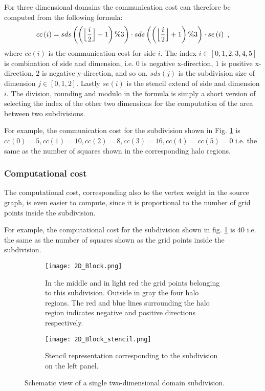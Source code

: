 For three dimensional domains the communication cost can therefore be computed from the following formula:
\begin{equation}
cc\left(i\right) = sds\left(\left(\floor[\Big]{\frac{i}{2}} - 1\right) \% 3 \right) \cdot sds\left(\left(\floor[\Big]{\frac{i}{2}} + 1\right) \% 3 \right) \cdot se\left(i\right) \text{ ,}
\end{equation}
where $cc\left(i\right)$ is the communication cost for side $i$.
The index $i \in \left[0, 1, 2, 3, 4, 5\right]$ is combination of side and dimension, i.e. $0$ is negative x-direction, $1$ is positive x-direction, $2$ is negative y-direction, and so on.
$sds\left(j\right)$ is the subdivision size of dimension $j \in \left[0,1,2\right]$.
Lastly $se\left(i\right)$ is the stencil extend of side and dimension $i$.
The division, rounding and modulo in the formula is simply a short version of selecting the index of the other two dimensions for the computation of the area between two subdivisions.

For example, the communication cost for the subdivision shown in Fig. \ref{fig:2DBlock} is $cc\left(0\right) = 5, cc\left(1\right) = 10, cc\left(2\right) = 8, cc\left(3\right) = 16, cc\left(4\right) = cc\left(5\right) = 0$ i.e. the same as the number of squares shown in the corresponding halo regions.

\subsubsection{Computational cost}
\label{sec:compcost}
The computational cost, corresponding also to the vertex weight in the source graph, is even easier to compute, since it is proportional to the number of grid points inside the subdivision.

For example, the computational cost for the subdivision shown in fig. \ref{fig:2DBlock} is $40$ i.e. the same as the number of squares shown as the grid points inside the subdivision.

\begin{figure}[!htbp]
\centering
\begin{subfigure}{0.8\textwidth}
  \centering
  \texttt{[image: 2D\_Block.png]}
  \caption{In the middle and in light red the grid points belonging to this subdivision.
Outside in gray the four halo regions.
The red and blue lines surrounding the halo region indicates negative and positive directions respectively.}
  \label{fig:2DBlock}
\end{subfigure}%
\begin{subfigure}{0.2\textwidth}
  \centering
  \texttt{[image: 2D\_Block\_stencil.png]}
  \caption{Stencil representation corresponding to the subdivision on the left panel.}
  \label{fig:2DBlockStencil}
\end{subfigure}
\caption{Schematic view of a single two-dimensional domain subdivision.}
\label{fig:2D_subdivision}
\end{figure}

